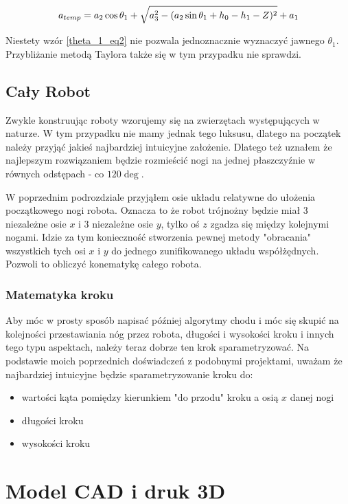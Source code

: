 \documentclass[a4paper,13pt]{article}
\begin{document}
\begin{equation} \label{theta_1_eq2}
a_{temp} = a_2 \cos{\theta_1} + \sqrt{a_3^2 - (a_2 \sin{\theta_1 + h_0 - h_1 - Z})^2} + a_1\\
\end{equation}

Niestety wzór \ref{theta_1_eq2} nie pozwala jednoznacznie wyznaczyć jawnego $\theta_1$. Przybliżanie metodą Taylora także się w tym przypadku nie sprawdzi. 

\subsection{Cały Robot}
Zwykle konstruując roboty wzorujemy się na zwierzętach występujących w naturze. W tym przypadku nie mamy jednak tego luksusu, dlatego na początek należy przyjąć jakieś najbardziej intuicyjne założenie. Dlatego też uznałem że najlepszym rozwiązaniem będzie rozmieścić nogi na jednej płaszczyźnie w równych odstępach - co $120\deg$.

W poprzednim podrozdziale przyjąłem osie układu relatywne do ułożenia początkowego nogi robota. Oznacza to że robot trójnożny będzie miał 3 niezależne osie $x$ i 3 niezależne osie $y$, tylko oś $z$ zgadza się między kolejnymi nogami. Idzie za tym konieczność stworzenia pewnej metody "obracania" wszystkich tych osi $x$ i $y$ do jednego zunifikowanego układu współżędnych. Pozwoli to obliczyć konematykę całego robota.

\subsubsection{Matematyka kroku}
Aby móc w prosty sposób napisać później algorytmy chodu i móc się skupić na kolejności przestawiania nóg przez robota, długości i wysokości kroku i innych tego typu aspektach, należy teraz dobrze ten krok sparametryzować. Na podstawie moich poprzednich doświadczeń z podobnymi projektami, uważam że najbardziej intuicyjne będzie sparametryzowanie kroku do:
\begin{itemize}
\item wartości kąta pomiędzy kierunkiem "do przodu" kroku a osią $x$ danej nogi
\item długości kroku
\item wysokości kroku
\end{itemize}



\section{Model CAD i druk 3D}
\end{document}
